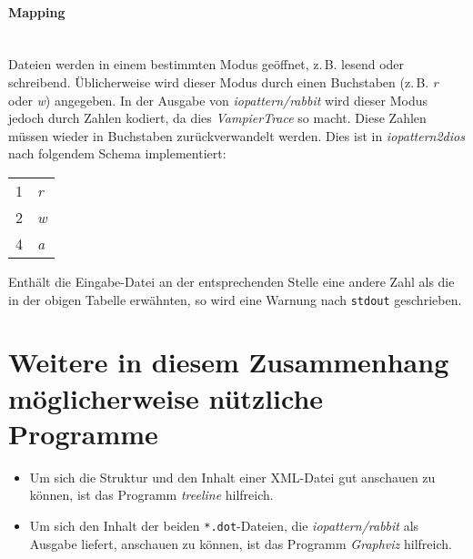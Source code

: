 \documentclass{scrartcl}
\begin{document}
\paragraph{Mapping}~\\
Dateien werden in einem bestimmten Modus geöffnet, z.\,B.
lesend oder schreibend. Üblicherweise wird dieser Modus durch einen 
Buchstaben (z.\,B. \emph{r} oder \emph{w}) angegeben. In der Ausgabe von
\emph{iopattern/rabbit} wird dieser Modus jedoch durch Zahlen kodiert, da dies 
\emph{VampierTrace} so macht. Diese Zahlen müssen wieder in Buchstaben 
zurückverwandelt werden. Dies ist in \emph{iopattern2dios} nach folgendem 
Schema implementiert:
\renewcommand{\arraystretch}{1.0}
\begin{center}
\begin{tabular}{ll}
1 & \emph{r}\\
2 & \emph{w}\\
4 & \emph{a}
\end{tabular}
\end{center}
Enthält die Eingabe-Datei an der entsprechenden Stelle eine andere Zahl als
die in der obigen Tabelle erwähnten, so wird eine Warnung nach \texttt{stdout}
geschrieben.
\section{Weitere in diesem Zusammenhang möglicherweise nützliche Programme}
\begin{itemize}
\item Um sich die Struktur und den Inhalt einer XML-Datei gut anschauen zu 
	können, ist das Programm \emph{treeline} hilfreich.
\item Um sich den Inhalt der beiden \texttt{*.dot}-Dateien, die 
	\emph{iopattern/rabbit} als Ausgabe liefert, anschauen zu können, 
	ist das Programm \emph{Graphviz} hilfreich.
\end{itemize}
\end{document}
